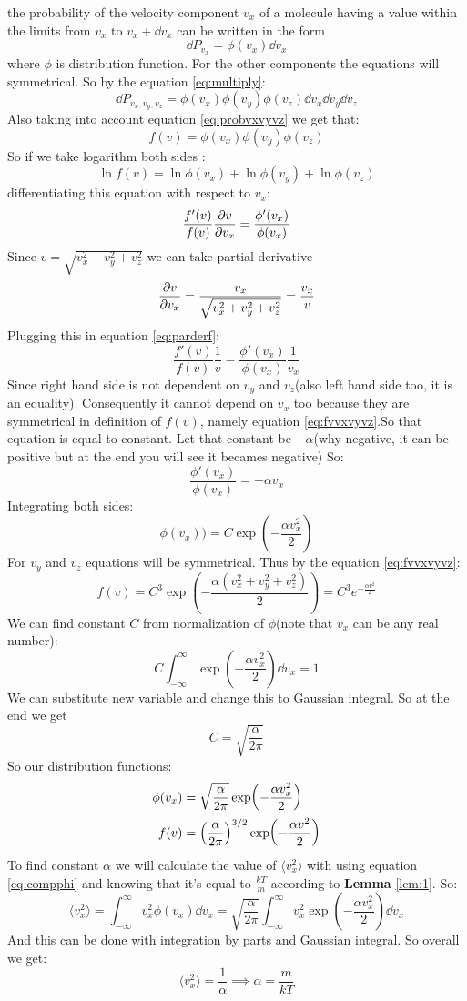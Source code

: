 \documentclass[a4paper, 12pt]{article}
\begin{document}
the probability of the velocity component $v_x$ of a molecule having a value within the limits from $v_x \text{ to }
v_x + \dd v_x$ can be written in the form
$$\dd P_{v_x} = \phi(v_x) \dd v_x$$ where $\phi$ is distribution function. For the other components the equations will 
symmetrical. So by the equation \ref{eq:multiply}: $$\dd P_{v_x,v_y,v_z}=\phi(v_x)\phi(v_y)\phi(v_z)\dd v_x\dd v_y\dd v_z$$
Also taking into account equation \ref{eq:probvxvyvz} we get that:
\begin{equation} \label{eq:fvvxvyvz}
    f(v)=\phi(v_x)\phi(v_y)\phi(v_z)
\end{equation} So if we take logarithm both sides :$$\ln f(v)=\ln \phi(v_x)+\ln \phi(v_y)+\ln\phi(v_z)
$$ differentiating this equation with respect to $v_x$:
\begin{equation} \label{eq:parderf}
    \frac{f'(v)}{f(v)}\pdv{v}{v_x}=\frac{\phi'(v_x)}{\phi(v_x)}
\end{equation} 
Since $v=\sqrt{v_x^2+v_y^2+v_z^2}$ we can take partial derivative
$$\pdv{v}{v_x}=\frac{v_x}{\sqrt{v_x^2+v_y^2+v_z^2}}=\frac{v_x}{v}$$
Plugging this in equation \ref{eq:parderf}:
$$\frac{f'(v)}{f(v)}\frac{1}{v}=\frac{\phi'(v_x)}{\phi(v_x)}\frac{1}{v_x}$$
Since right hand side is not dependent on $v_y$ and $v_z$(also left hand side too, it is an equality). Consequently it cannot depend on $v_x$ too
because they are symmetrical in definition of $f(v)$, namely equation \ref{eq:fvvxvyvz}.So that equation is equal to constant.
Let that constant be $-\alpha$(why negative, it can be positive but at the end you will see it becames negative)
So: $$\frac{\phi'(v_x)}{\phi(v_x)}=-\alpha v_x$$ Integrating both sides: $$\phi(v_x))=C\exp(-\frac{\alpha v_x^2}{2})$$
For $v_y$ and $v_z$ equations will be symmetrical. Thus by the equation \ref{eq:fvvxvyvz}:
$$f(v)=C^3\exp(-\frac{\alpha(v_x^2+v_y^2+v_z^2)}{2})=C^3e^{-\frac{\alpha v^2}{2}}$$
We can find constant $C$ from normalization of $\phi$(note that $v_x$ can be any real number):
\begin{equation}\label{eq:normal}
    C\int_{-\infty}^\infty \exp(-\frac{\alpha v_x^2}{2})\dd v_x=1
\end{equation} 
We can substitute new variable and change this to Gaussian integral. So at the end we get $$C=\sqrt{\frac{\alpha}{2\pi}}$$
So our distribution functions:
\begin{align}
    \label{eq:compphi}
    \phi(v_x)&=\sqrt{\frac{\alpha}{2\pi}}\exp(-\frac{\alpha v_x^2}{2}) \\
    \label{eq:compf}
    f(v)&=\qty(\frac{\alpha}{2\pi})^{3/2}\exp(-\frac{\alpha v^2}{2}) 
\end{align}
To find constant $\alpha$ we will calculate the value of $\langle v_x^2\rangle$ with using equation \ref{eq:compphi} and knowing that
it's equal  to $\frac{kT}{m}$ according to \textbf{Lemma} \ref{lem:1}. So:
\begin{equation}\label{eq:normalvx}
    \langle v_x^2\rangle=\int_{-\infty}^\infty v_x^2\phi(v_x)\dd v_x=\sqrt{\frac{\alpha}{2\pi}}\int_{-\infty}^\infty v_x^2\exp(-\frac{\alpha v_x^2}{2})\dd v_x
\end{equation}
And this can be done with integration by parts and Gaussian integral. So overall we get:
$$\langle v_x^2\rangle=\frac{1}{\alpha}\implies\alpha=\frac{m}{kT}$$
\end{document}
